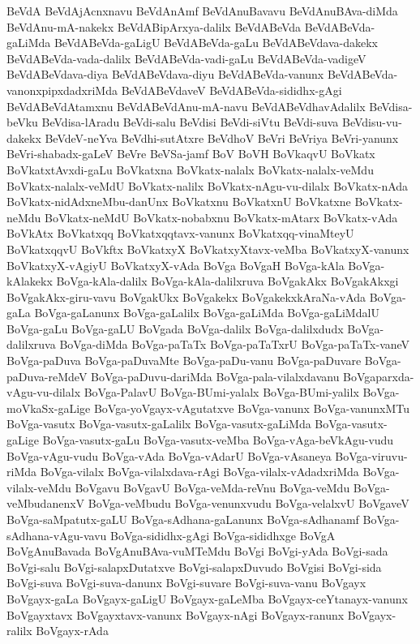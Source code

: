 {BeVdA
BeVdAjAcnxnavu
BeVdAnAmf
BeVdAnuBavavu
BeVdAnuBAva-diMda
BeVdAnu-mA-nakekx
BeVdABipArxya-dalilx
BeVdABeVda
BeVdABeVda-gaLiMda
BeVdABeVda-gaLigU
BeVdABeVda-gaLu
BeVdABeVdava-dakekx
BeVdABeVda-vada-dalilx
BeVdABeVda-vadi-gaLu
BeVdABeVda-vadigeV
BeVdABeVdava-diya
BeVdABeVdava-diyu
BeVdABeVda-vanunx
BeVdABeVda-vanonxpipxdadxriMda
BeVdABeVdaveV
BeVdABeVda-sididhx-gAgi
BeVdABeVdAtamxnu
BeVdABeVdAnu-mA-navu
BeVdABeVdhavAdalilx
BeVdisa-beVku
BeVdisa-lAradu
BeVdi-salu
BeVdisi
BeVdi-siVtu
BeVdi-suva
BeVdisu-vu-dakekx
BeVdeV-neYva
BeVdhi-sutAtxre
BeVdhoV
BeVri
BeVriya
BeVri-yanunx
BeVri-shabadx-gaLeV
BeVre
BeVSa-jamf
BoV
BoVH
BoVkaqvU
BoVkatx
BoVkatxtAvxdi-gaLu
BoVkatxna
BoVkatx-nalalx
BoVkatx-nalalx-veMdu
BoVkatx-nalalx-veMdU
BoVkatx-nalilx
BoVkatx-nAgu-vu-dilalx
BoVkatx-nAda
BoVkatx-nidAdxneMbu-danUnx
BoVkatxnu
BoVkatxnU
BoVkatxne
BoVkatx-neMdu
BoVkatx-neMdU
BoVkatx-nobabxnu
BoVkatx-mAtarx
BoVkatx-vAda
BoVkAtx
BoVkatxqq
BoVkatxqqtavx-vanunx
BoVkatxqq-vinaMteyU
BoVkatxqqvU
BoVkftx
BoVkatxyX
BoVkatxyXtavx-veMba
BoVkatxyX-vanunx
BoVkatxyX-vAgiyU
BoVkatxyX-vAda
BoVga
BoVgaH
BoVga-kAla
BoVga-kAlakekx
BoVga-kAla-dalilx
BoVga-kAla-dalilxruva
BoVgakAkx
BoVgakAkxgi
BoVgakAkx-giru-vavu
BoVgakUkx
BoVgakekx
BoVgakekxkAraNa-vAda
BoVga-gaLa
BoVga-gaLanunx
BoVga-gaLalilx
BoVga-gaLiMda
BoVga-gaLiMdalU
BoVga-gaLu
BoVga-gaLU
BoVgada
BoVga-dalilx
BoVga-dalilxdudx
BoVga-dalilxruva
BoVga-diMda
BoVga-paTaTx
BoVga-paTaTxrU
BoVga-paTaTx-vaneV
BoVga-paDuva
BoVga-paDuvaMte
BoVga-paDu-vanu
BoVga-paDuvare
BoVga-paDuva-reMdeV
BoVga-paDuvu-dariMda
BoVga-pala-vilalxdavanu
BoVgaparxda-vAgu-vu-dilalx
BoVga-PalavU
BoVga-BUmi-yalalx
BoVga-BUmi-yalilx
BoVga-moVkaSx-gaLige
BoVga-yoVgayx-vAgutatxve
BoVga-vanunx
BoVga-vanunxMTu
BoVga-vasutx
BoVga-vasutx-gaLalilx
BoVga-vasutx-gaLiMda
BoVga-vasutx-gaLige
BoVga-vasutx-gaLu
BoVga-vasutx-veMba
BoVga-vAga-beVkAgu-vudu
BoVga-vAgu-vudu
BoVga-vAda
BoVga-vAdarU
BoVga-vAsaneya
BoVga-viruvu-riMda
BoVga-vilalx
BoVga-vilalxdava-rAgi
BoVga-vilalx-vAdadxriMda
BoVga-vilalx-veMdu
BoVgavu
BoVgavU
BoVga-veMda-reVnu
BoVga-veMdu
BoVga-veMbudanenxV
BoVga-veMbudu
BoVga-venunxvudu
BoVga-velalxvU
BoVgaveV
BoVga-saMpatutx-gaLU
BoVga-sAdhana-gaLanunx
BoVga-sAdhanamf
BoVga-sAdhana-vAgu-vavu
BoVga-sididhx-gAgi
BoVga-sididhxge
BoVgA
BoVgAnuBavada
BoVgAnuBAva-vuMTeMdu
BoVgi
BoVgi-yAda
BoVgi-sada
BoVgi-salu
BoVgi-salapxDutatxve
BoVgi-salapxDuvudo
BoVgisi
BoVgi-sida
BoVgi-suva
BoVgi-suva-danunx
BoVgi-suvare
BoVgi-suva-vanu
BoVgayx
BoVgayx-gaLa
BoVgayx-gaLigU
BoVgayx-gaLeMba
BoVgayx-ceYtanayx-vanunx
BoVgayxtavx
BoVgayxtavx-vanunx
BoVgayx-nAgi
BoVgayx-ranunx
BoVgayx-ralilx
BoVgayx-rAda
}
